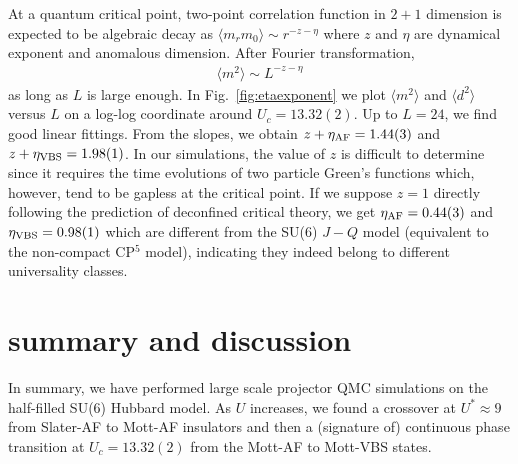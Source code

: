 \documentclass[twocolumn,superscriptaddress,prb]{revtex4-1}
\begin{document}
At a quantum critical point, two-point correlation function in $2+1$ dimension is expected to be algebraic decay as $\langle m_rm_0\rangle\sim r^{-z-\eta}$ where $z$ and $\eta$ are dynamical exponent and anomalous dimension. \cite{Sondhi_RMP_1997} After Fourier transformation, \begin{eqnarray} \langle m^2 \rangle \sim L^{-z-\eta} \end{eqnarray}
as long as $L$ is large enough. In Fig.~\ref{fig:etaexponent} we plot $\langle m^2 \rangle$ and $\langle d^2\rangle$ versus $L$ on a log-log coordinate around $U_c=13.32(2)$. Up to $L=24$, we find good linear fittings. From the slopes, we obtain $z+\eta_{\rm AF}=1.44(3)$ and $z+\eta_{\rm VBS}=1.98(1)$. In our simulations, the value of $z$ is difficult to determine since it requires the time evolutions of two particle Green's functions which, however, tend to be gapless at the critical point. If we suppose $z=1$ directly following the prediction of deconfined critical theory, \cite{Senthil_S_2004,*Senthil_PRB_2004,*Levin_PRB_2004} we get $\eta_{\rm AF}=0.44(3)$ and $\eta_{\rm VBS}=0.98(1)$ which are different from the SU(6) $J-Q$ model (equivalent to the non-compact CP$^5$ model), \cite{Kaul_PRL_2012} indicating they indeed belong to different universality classes. 




\section{summary and discussion}
In summary, we have performed large scale projector QMC simulations on the half-filled SU(6) Hubbard model. As $U$ increases, we found a crossover at $U^*\approx9$ from Slater-AF to Mott-AF insulators and then a (signature of) continuous phase transition at $U_c=13.32(2)$ from the Mott-AF to Mott-VBS states. 
\end{document}
